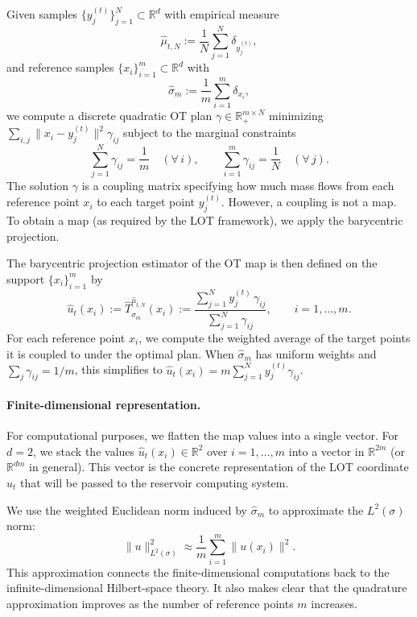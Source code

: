 \documentclass[11pt]{article}
\newcommand{\R}{\mathbb{R}}
\newcommand{\1}{\mathbf{1}}
\begin{document}
Given samples $\{y_j^{(t)}\}_{j=1}^N\subset\R^d$ with empirical measure
\[
\hat\mu_{t,N}:=\frac1N\sum_{j=1}^N\delta_{y_j^{(t)}},
\]
and reference samples $\{x_i\}_{i=1}^m\subset\R^d$ with
\[
\hat\sigma_m:=\frac1m\sum_{i=1}^m\delta_{x_i},
\]
we compute a discrete quadratic OT plan $\gamma\in\R_+^{m\times N}$ minimizing $\sum_{i,j}\|x_i-y_j^{(t)}\|^2\gamma_{ij}$ subject to the marginal constraints
\[
\sum_{j=1}^N\gamma_{ij}=\frac1m\quad(\forall\, i),\qquad
\sum_{i=1}^m\gamma_{ij}=\frac1N\quad(\forall\, j).
\]
The solution $\gamma$ is a coupling matrix specifying how much mass flows from each reference point $x_i$ to each target point $y_j^{(t)}$. However, a coupling is not a map. To obtain a map (as required by the LOT framework), we apply the barycentric projection.

The barycentric projection estimator of the OT map is then defined on the support
$\{x_i\}_{i=1}^m$ by
\begin{equation}\label{eq:baryproj-prelim}
\hat u_t(x_i) := \hat T_{\hat\sigma_m}^{\hat\mu_{t,N}}(x_i)
:= \frac{\sum_{j=1}^{N} y_j^{(t)}\,\gamma_{ij}}{\sum_{j=1}^{N}\gamma_{ij}},
\qquad i=1,\dots,m.
\end{equation}
For each reference point $x_i$, we compute the weighted average of the target points it is coupled to under the optimal plan. When $\hat\sigma_m$ has uniform weights and $\sum_{j}\gamma_{ij}=1/m$, this simplifies to $\hat u_t(x_i)=m\sum_{j=1}^N y_j^{(t)}\gamma_{ij}$.

\paragraph{Finite-dimensional representation.}
For computational purposes, we flatten the map values into a single vector. For $d=2$, we stack the values $\hat u_t(x_i)\in\R^2$ over $i=1,\dots,m$ into a vector in $\R^{2m}$ (or $\R^{dm}$ in general). This vector is the concrete representation of the LOT coordinate $u_t$ that will be passed to the reservoir computing system. 

We use the weighted Euclidean norm induced by $\hat\sigma_m$ to approximate the $L^2(\sigma)$ norm:
\begin{equation}\label{eq:empirical-L2}
\|u\|_{L^2(\sigma)}^2 \approx \frac1m\sum_{i=1}^m \|u(x_i)\|^2.
\end{equation}
This approximation connects the finite-dimensional computations back to the infinite-dimensional Hilbert-space theory. It also makes clear that the quadrature approximation improves as the number of reference points $m$ increases.
\end{document}
